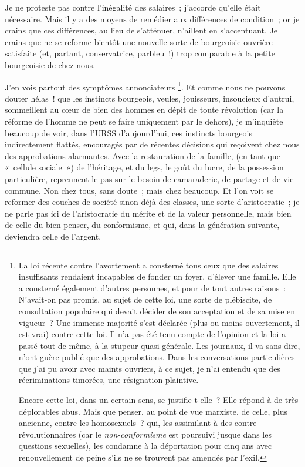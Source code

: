 \documentclass[french,twoside]{book} %
\begin{document}
\noindent Je ne proteste pas contre l’inégalité des salaires ; j’accorde qu’elle était nécessaire. Mais il y a des moyens de remédier aux différences de condition ; or je crains que ces différences, au lieu de s’atténuer, n’aillent en s’accentuant. Je crains que ne se reforme bientôt une nouvelle sorte de bourgeoisie ouvrière satisfaite (et, partant, conservatrice, parbleu !) trop comparable à la petite bourgeoisie de chez nous.\par
J’en vois partout des symptômes annonciateurs \footnote{ \noindent La loi récente contre l’avortement a consterné tous ceux que des salaires insuffisants rendaient incapables de fonder un foyer, d’élever une famille. Elle a consterné également d’autres personnes, et pour de tout autres raisons : N’avait-on pas promis, au sujet de cette loi, une sorte de plébiscite, de consultation populaire qui devait décider de son acceptation et de sa mise en vigueur ? Une immense majorité s’est déclarée (plus ou moins ouvertement, il est vrai) contre cette loi. Il n’a pas été tenu compte de l’opinion et la loi a passé tout de même, à la stupeur quasi-générale. Les journaux, il va sans dire, n’ont guère publié que des approbations. Dans les conversations particulières que j’ai pu avoir avec maints ouvriers, à ce sujet, je n’ai entendu que des récriminations timorées, une résignation plaintive.\par
 Encore cette loi, dans un certain sens, se justifie-t-elle ? Elle répond à de très déplorables abus. Mais que penser, au point de vue marxiste, de celle, plus ancienne, contre les homosexuels ? qui, les assimilant à des contre-révolutionnaires (car le \emph{non-conformisme} est poursuivi jusque dans les questions sexuelles), les condamne à la déportation pour cinq ans avec renouvellement de peine s’ils ne se trouvent pas amendés par l’exil.
}. Et comme nous ne pouvons douter hélas ! que les instincts bourgeois, veules, jouisseurs, insoucieux d’autrui, sommeillent au cœur de bien des hommes en dépit de toute révolution (car la réforme de l’homme ne peut se faire uniquement par le dehors), je m’inquiète beaucoup de voir, dans l’URSS d’aujourd’hui, ces instincts bourgeois indirectement flattés, encouragés par de récentes décisions qui reçoivent chez nous des approbations alarmantes. Avec la restauration de la famille, (en tant que « cellule sociale ») de l’héritage, et du legs, le goût du lucre, de la possession particulière, reprennent le pas sur le besoin de camaraderie, de partage et de vie commune. Non chez tous, sans doute ; mais chez beaucoup. Et l’on voit se reformer des couches de société sinon déjà des classes, une sorte d’aristocratie ; je ne parle pas ici de l’aristocratie du mérite et de la valeur personnelle, mais bien de celle du bien-penser, du conformisme, et qui, dans la génération suivante, deviendra celle de l’argent.\par
\end{document}
